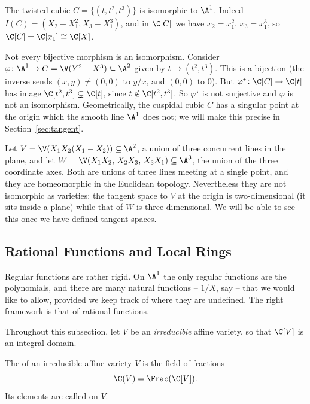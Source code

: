 \begin{example}
	The twisted cubic $C = \{(t,t^2,t^3)\}$ is isomorphic to $\A^1$. Indeed $I(C) = (X_2 - X_1^2, X_3 - X_1^3)$, and in $\C[C]$ we have $x_2 = x_1^2$, $x_3 = x_1^3$, so $\C[C] = \C[x_1] \cong \C[X]$.
\end{example}

\begin{example}
	Not every bijective morphism is an isomorphism. Consider $\varphi \colon \A^1 \to C = \V(Y^2 - X^3) \subseteq \A^2$ given by $t \mapsto (t^2,t^3)$. This is a bijection (the inverse sends $(x,y) \neq (0,0)$ to $y/x$, and $(0,0)$ to $0$). But $\varphi^\star \colon \C[C] \to \C[t]$ has image $\C[t^2,t^3] \subsetneq \C[t]$, since $t \notin \C[t^2,t^3]$. So $\varphi^\star$ is not surjective and $\varphi$ is not an isomorphism. Geometrically, the cuspidal cubic $C$ has a singular point at the origin which the smooth line $\A^1$ does not; we will make this precise in Section~\ref{sec:tangent}.
\end{example}

\begin{example}\label{ex:threelines}
	Let $V = \V(X_1X_2(X_1-X_2)) \subseteq \A^2$, a union of three concurrent lines in the plane, and let $W = \V(X_1X_2,\, X_2X_3,\, X_3X_1) \subseteq \A^3$, the union of the three coordinate axes. Both are unions of three lines meeting at a single point, and they are homeomorphic in the Euclidean topology. Nevertheless they are not isomorphic as varieties: the tangent space to $V$ at the origin is two-dimensional (it sits inside a plane) while that of $W$ is three-dimensional. We will be able to see this once we have defined tangent spaces.
\end{example}

\subsection{Rational Functions and Local Rings}

Regular functions are rather rigid. On $\A^1$ the only regular functions are the polynomials, and there are many natural functions -- $1/X$, say -- that we would like to allow, provided we keep track of where they are undefined. The right framework is that of rational functions.

Throughout this subsection, let $V$ be an \emph{irreducible} affine variety, so that $\C[V]$ is an integral domain.

\begin{definition}
	The  of an irreducible affine variety $V$ is the field of fractions
	$$\C(V) = \Frac(\C[V]).$$
	Its elements are called  on $V$.
\end{definition}

